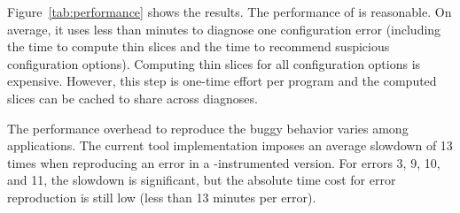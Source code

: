Figure~\ref{tab:performance} shows the results.
The performance of \ourtool is reasonable.
On average, it uses less than \avgtime minutes to
diagnose one configuration error (including
the time to compute thin slices and the time
to recommend suspicious configuration options). Computing
thin slices for all configuration options
is expensive. However, this step is one-time effort
per program and the computed slices can be cached
to share across diagnoses. %

The performance overhead to reproduce the buggy behavior varies
among applications. The current tool implementation
imposes an average slowdown of 13 times when reproducing
an error in a \ourtool-instrumented version.
For errors 3, 9, 10, and 11, the slowdown is significant, but the
absolute time cost for error reproduction is still low (less than 13
minutes per error).





